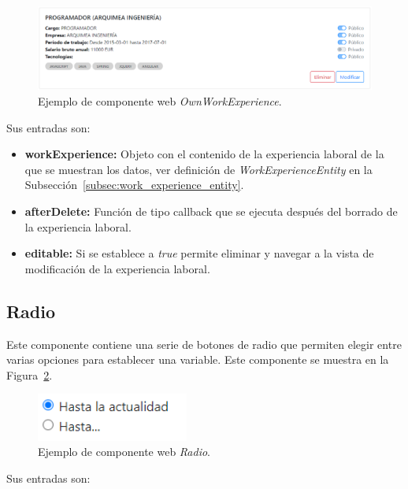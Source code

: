 \documentclass[a4paper, 12pt]{book}
\begin{document}
    \begin{figure}
        \centering
        \includegraphics[width=15cm, keepaspectratio]{img/OwnWorkExperience.PNG}
        \caption{Ejemplo de componente web \emph{OwnWorkExperience}.}\label{fig:component_own_work_experience}
    \end{figure}

    Sus entradas son:

    \begin{itemize}
        \item \textbf{workExperience:} Objeto con el contenido de la experiencia laboral de la que se muestran los datos, ver definición de \emph{WorkExperienceEntity} en la Subsección~\ref{subsec:work_experience_entity}.
        \item \textbf{afterDelete:} Función de tipo callback que se ejecuta después del borrado de la experiencia laboral.
        \item \textbf{editable:} Si se establece a \emph{true} permite eliminar y navegar a la vista de modificación de la experiencia laboral.
    \end{itemize}

    \subsection{Radio}
    \label{subsec:wc_radio}
    Este componente contiene una serie de botones de radio que permiten elegir entre varias opciones para establecer una variable.
    Este componente se muestra en la Figura~\ref{fig:component_radio}.

    \begin{figure}
        \centering
        \includegraphics[width=5cm, keepaspectratio]{img/Radio.PNG}
        \caption{Ejemplo de componente web \emph{Radio}.}\label{fig:component_radio}
    \end{figure}

    Sus entradas son:
\end{document}
